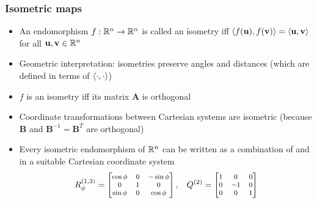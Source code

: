 \begin{frame}
  \frametitle{Isometric maps} 

  \begin{itemize}
  \item An endomorphism $f: \mathbb{R}^n \to \mathbb{R}^n$ is called an \h{isometry} iff
    $\sprod{f(\vu)}{f(\vv)} = \sprod{\vu}{\vv}$ for all $\vu,\vv\in \setR^n$%
  \item Geometric interpretation: isometries preserve angles and distances
    (which are defined in terms of $\left\langle \cdot, \cdot \right\rangle$)%
    \pause
  \item $f$ is an isometry iff its matrix $\mathbf{A}$ is orthogonal%
    \pause
  \item Coordinate transformations between Cartesian systems are isometric
    (because $\mathbf{B}$ and $\mathbf{B}^{-1} = \mathbf{B}^T$ are orthogonal)%
    \pause
  \item Every isometric endomorphism of $\mathbb{R}^n$ can be written as a
    combination of  and  in a
    suitable Cartesian coordinate system
      \[\footnotesize
      R_{\phi}^{(1,3)} = 
      \begin{bmatrix}
        \cos \phi & 0 & -\sin \phi \\
        0         & 1 &  0         \\
        \sin \phi & 0 &  \cos \phi 
      \end{bmatrix}, 
      \quad
      Q^{(2)} = 
      \begin{bmatrix}
        1 &  0 & 0 \\
        0 & -1 & 0 \\
        0 &  0 & 1
      \end{bmatrix}
      \]
  \end{itemize}
\end{frame}

